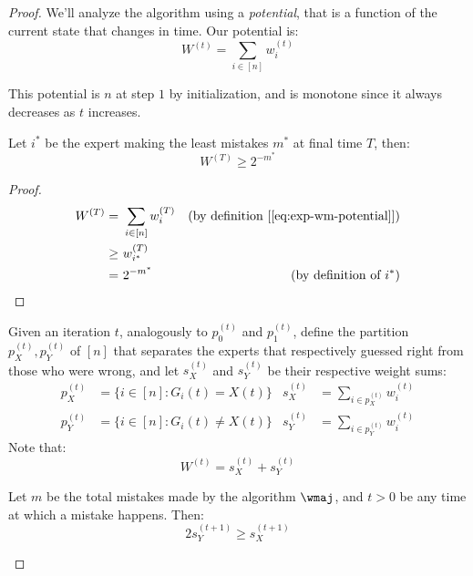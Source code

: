\begin{proof}
    We'll analyze the algorithm using a \emph{potential}, that is a function of the current state that changes in time. Our potential is:
    \begin{equation}\label{eq:exp-wm-potential}
        W^{(t)} = \sum_{i \in [n]} w_i^{(t)}
    \end{equation}
    
    This potential is $n$ at step $1$ by initialization, and is monotone since it always decreases as $t$ increases.

    \begin{claim}\label{cl:exp-wm-2}
        Let $i^*$ be the expert making the least mistakes $m^*$ at final time $T$, then:
        \[
            W^{(T)} \geq 2^{-m^*}
        \]
    \end{claim}

    \begin{proof}
        \begin{align*}
                    W^{(T)}
               =&\ \sum_{i \in [n]} w_i^{(T)}   & \text{(by definition [\ref{eq:exp-wm-potential}])} \\
            \geq&\ w_{i^*}^{(T)}                & \\
               =&\ 2^{-m^*}                     & \text{(by definition of $i^*$)}
        \end{align*}
    \end{proof}

    \begin{definition}\label{def:expertsides}
        Given an iteration $t$, analogously to $p_0^{(t)}$ and $p_1^{(t)}$, define the partition $p_X^{(t)}, p_Y^{(t)}$ of $[n]$ that separates the experts that respectively guessed right from those who were wrong, and let $s_X^{(t)}$ and $s_Y^{(t)}$ be their respective weight sums:
        \begin{align*}
            p_X^{(t)} &= \{i \in [n] : G_i(t) = X(t)\}      & s_X^{(t)} &= \sum_{i \in p_X^{(t)}} w_i^{(t)} \\
            p_Y^{(t)} &= \{i \in [n] : G_i(t) \neq X(t)\}   & s_Y^{(t)} &= \sum_{i \in p_Y^{(t)}} w_i^{(t)}
        \end{align*}
        Note that:
        \[
            W^{(t)} = s_X^{(t)} + s_Y^{(t)}
        \]
    \end{definition}

    \begin{lemma}\label{lem:sidesmistake}
        Let $m$ be the total mistakes made by the algorithm $\wmaj$, and $t > 0$ be any time at which a mistake happens. Then:
        \[
            2 s_Y^{(t + 1)} \geq s_X^{(t + 1)}
        \]
    \end{lemma}


\end{proof}
